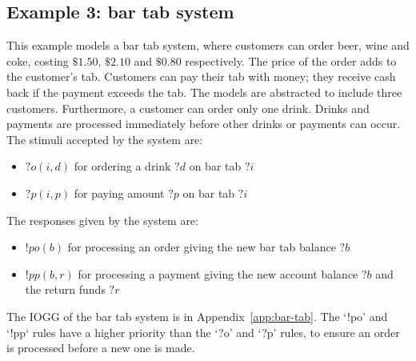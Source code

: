 %    

\subsection{Example 3: bar tab system}
This example models a bar tab system, where customers can order beer, wine and coke, costing $\$1.50$, $\$2.10$ and $\$0.80$ respectively. The price of the order adds to the customer's tab. Customers can pay their tab with money; they receive cash back if the payment exceeds the tab. The models are abstracted to include three customers. Furthermore, a customer can order only one drink. Drinks and payments are processed immediately before other drinks or payments can occur. The stimuli accepted by the system are:
\begin{itemize}
\item $?o(i,d)$ for ordering a drink $?d$ on bar tab $?i$
\item $?p(i,p)$ for paying amount $?p$ on bar tab $?i$
\end{itemize}
The responses given by the system are:
\begin{itemize}
\item $!po(b)$ for processing an order giving the new bar tab balance $?b$
\item $!pp(b,r)$ for processing a payment giving the new account balance $?b$ and the return funds $?r$
\end{itemize}

The IOGG of the bar tab system is in Appendix~\ref{app:bar-tab}. The `!po' and `!pp` rules have a higher priority than the `?o' and `?p' rules, to ensure an order is processed before a new one is made.


